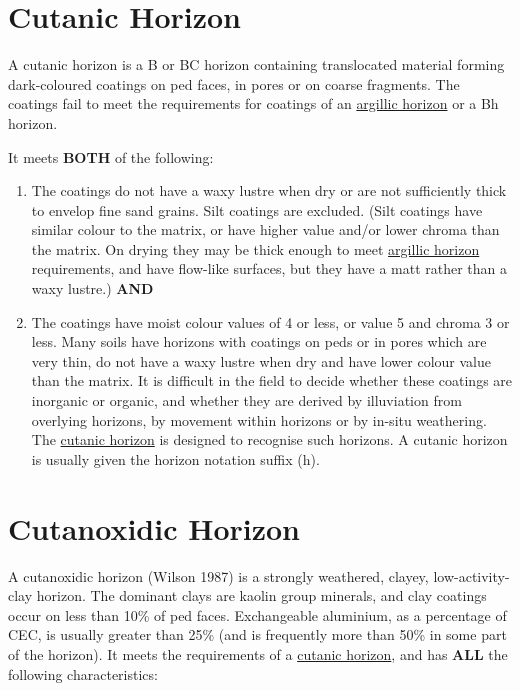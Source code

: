 \documentclass[
  letterpaper,
  DIV=11,
  numbers=noendperiod]{scrreprt}
\providecommand{\tightlist}{%
  \setlength{\itemsep}{0pt}\setlength{\parskip}{0pt}}\usepackage{longtable,booktabs,array}
\begin{document}
\hypertarget{sec-diag-cuth}{%
\section{Cutanic Horizon}\label{sec-diag-cuth}}

A cutanic horizon is a B or BC horizon containing translocated material
forming dark-coloured coatings on ped faces, in pores or on coarse
fragments. The coatings fail to meet the requirements for coatings of an
\protect\hyperlink{sec-diag-argh}{argillic horizon} or a Bh horizon.

It meets \textbf{BOTH} of the following:

\begin{enumerate}
\def\labelenumi{\arabic{enumi}.}
\tightlist
\item
  The coatings do not have a waxy lustre when dry or are not
  sufficiently thick to envelop fine sand grains. Silt coatings are
  excluded. (Silt coatings have similar colour to the matrix, or have
  higher value and/or lower chroma than the matrix. On drying they may
  be thick enough to meet \protect\hyperlink{sec-diag-argh}{argillic
  horizon} requirements, and have flow-like surfaces, but they have a
  matt rather than a waxy lustre.) \textbf{AND}
\item
  The coatings have moist colour values of 4 or less, or value 5 and
  chroma 3 or less. Many soils have horizons with coatings on peds or in
  pores which are very thin, do not have a waxy lustre when dry and have
  lower colour value than the matrix. It is difficult in the field to
  decide whether these coatings are inorganic or organic, and whether
  they are derived by illuviation from overlying horizons, by movement
  within horizons or by in-situ weathering. The
  \protect\hyperlink{sec-diag-cuth}{cutanic horizon} is designed to
  recognise such horizons. A cutanic horizon is usually given the
  horizon notation suffix (h).
\end{enumerate}

\hypertarget{sec-diag-cutoxh}{%
\section{Cutanoxidic Horizon}\label{sec-diag-cutoxh}}

A cutanoxidic horizon (Wilson 1987) is a strongly weathered, clayey,
low-activity-clay horizon. The dominant clays are kaolin group minerals,
and clay coatings occur on less than 10\% of ped faces. Exchangeable
aluminium, as a percentage of CEC, is usually greater than 25\% (and is
frequently more than 50\% in some part of the horizon). It meets the
requirements of a \protect\hyperlink{sec-diag-cuth}{cutanic horizon},
and has \textbf{ALL} the following characteristics:
\end{document}
